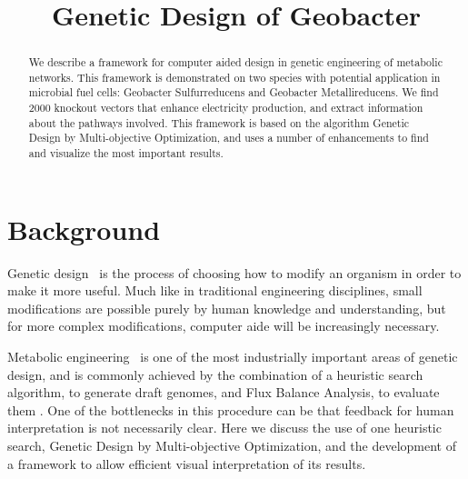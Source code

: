 \documentclass[a4paper]{article}
\begin{document}
\title{Genetic Design of Geobacter}
\maketitle
\begin{abstract}

We describe a framework for computer aided design in genetic engineering of metabolic networks. This framework is demonstrated on two species with potential application in microbial fuel cells: Geobacter Sulfurreducens and Geobacter Metallireducens. We find 2000 knockout vectors that enhance electricity production, and extract information about the pathways involved. This framework is based on the algorithm Genetic Design by Multi-objective Optimization, and uses a number of enhancements to find and visualize the most important results.
\end{abstract}

\section{Background} 

Genetic design~ is the process of choosing how to modify an organism in order to make it more useful. Much like in traditional engineering disciplines, small modifications are possible purely by human knowledge and understanding, but for more complex modifications, computer aide will be increasingly necessary.

Metabolic engineering~ is one of the most industrially important areas of genetic design, and is commonly achieved by the combination of a heuristic search algorithm, to generate draft genomes, and Flux Balance Analysis, to evaluate them . One of the bottlenecks in this procedure can be that feedback for human interpretation is not necessarily clear. Here we discuss the use of one heuristic search, Genetic Design by Multi-objective Optimization, and the development of a framework to allow efficient visual interpretation of its results.
\end{document}
